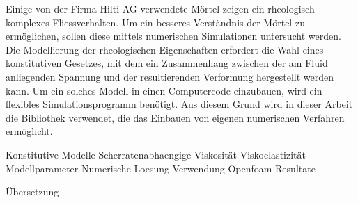 \thispagestyle{empty}
\begin{abstr}
Einige von der Firma Hilti AG verwendete Mörtel zeigen ein rheologisch komplexes Fliessverhalten. Um ein besseres Verständnis der Mörtel zu ermöglichen, sollen diese mittels numerischen Simulationen untersucht werden.
Die Modellierung der rheologischen Eigenschaften erfordert die Wahl eines konstitutiven Gesetzes, mit dem ein Zusammenhang zwischen der am Fluid anliegenden Spannung und der resultierenden Verformung hergestellt werden kann.
Um ein solches Modell in einen Computercode einzubauen, wird ein flexibles Simulationsprogramm benötigt.
Aus diesem Grund wird in dieser Arbeit die Bibliothek \openfoam{} verwendet, die das Einbauen von eigenen numerischen Verfahren ermöglicht.


\begin{todocontent}
    \1 Konstitutive Modelle
    \1 Scherratenabhaengige Viskosität
    \1 Viskoelastizität
    \1 Modellparameter
    \1 Numerische Loesung
    \1 Verwendung Openfoam
    \1 Resultate
\end{todocontent}
\end{abstr}
%
%
\begin{abstr}
    \begin{todocontent}
        \1 Übersetzung
    \end{todocontent}
\end{abstr}
%
